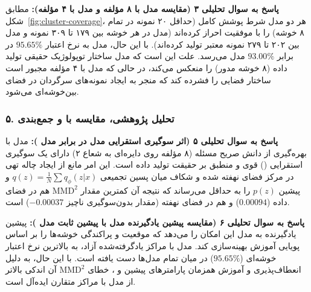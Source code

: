 \textbf{پاسخ به سوال تحلیلی ۳ (مقایسه مدل  با ۸ مؤلفه و مدل  با ۴ مؤلفه):}
مطابق شکل~\ref{fig:cluster-coverage}، هر دو مدل شرط پوشش کامل (حداقل ۲۰ نمونه در تمام ۸ خوشه) را با موفقیت احراز کرده‌اند (مدل  در هر خوشه بین ۱۷۹ تا ۳۰۹ نمونه و مدل  بین ۲۰۲ تا ۲۷۹ نمونه معتبر تولید کرده‌اند). با این حال، مدل  به نرخ اعتبار $95.65\%$ در برابر $93.00\%$ مدل  می‌رسد. علت این است که مدل  ساختار توپولوژیک حقیقی تولید داده (۸ خوشه مدور) را منعکس می‌کند، در حالی که مدل  با ۴ مؤلفه مجبور است ساختار فضایی را فشرده کند که منجر به ایجاد نمونه‌های سرگردان در فضای بین‌خوشه‌ای می‌شود.

\subsubsection{۵. تحلیل پژوهشی، مقایسه با  و جمع‌بندی}
\label{sec:q2-research}

\textbf{پاسخ به سوال تحلیلی ۵ (اثر سوگیری استقرایی مدل  در برابر مدل ):}
مدل  با بهره‌گیری از دانش صریح مسئله (۸ مؤلفه روی دایره‌ای به شعاع ۲) دارای یک سوگیری استقرایی () قوی و منطبق بر حقیقت تولید داده است. این امر مانع از ایجاد چاله تهی در مرکز فضای نهفته شده و شکاف میان پسین تجمیعی $q(z) = \frac{1}{N}\sum q_\phi(z|x)$ و پیشین $p(z)$ را به حداقل می‌رساند که نتیجه آن کمترین مقدار $\text{MMD}^2$ هم در فضای داده ($0.00094$) و هم در فضای نهفته (مقدار بدون‌سوگیری ناچیز $-0.00037$) است.

\textbf{پاسخ به سوال تحلیلی ۶ (مقایسه پیشین یادگیرنده مدل  با پیشین ثابت مدل ):}
پیشین یادگیرنده به مدل این امکان را می‌دهد که موقعیت و پراکندگی خوشه‌ها را بر اساس پویایی آموزش بهینه‌سازی کند. مدل  با مراکز یادگرفته‌شده آزاد، به بالاترین نرخ اعتبار خوشه‌ای ($95.65\%$) در میان تمام مدل‌ها دست یافته است. با این حال، به دلیل انعطاف‌پذیری و آموزش همزمان پارامترهای پیشین و ، خطای $\text{MMD}^2$ آن اندکی بالاتر از مدل  با مراکز متقارن ایده‌آل است.

